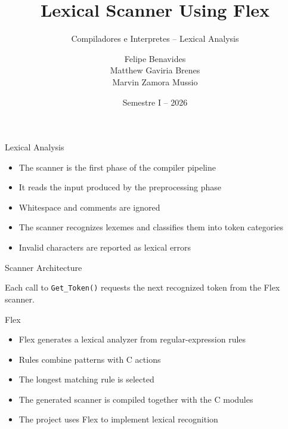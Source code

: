 \documentclass[aspectratio=169]{beamer}
\title{Lexical Scanner Using Flex}
\subtitle{Compiladores e Interpretes -- Lexical Analysis}
\author[F. Benavides, M. Gaviria, M. Zamora]{Felipe Benavides \\ Matthew Gaviria Brenes \\ Marvin Zamora Mussio}
\institute[TEC]{Ingenieria en Computación}
\date{Semestre I -- 2026}
\begin{document}
\begin{frame}
\titlepage
\end{frame}

\begin{frame}{Lexical Analysis}
\begin{itemize}
\item The scanner is the first phase of the compiler pipeline
\item It reads the input produced by the preprocessing phase
\item Whitespace and comments are ignored
\item The scanner recognizes lexemes and classifies them into token categories
\item Invalid characters are reported as lexical errors
\end{itemize}
\end{frame}

\begin{frame}{Scanner Architecture}
\begin{center}
\end{center}
\par\vspace{0.6cm}
\centering Each call to \texttt{Get\_Token()} requests the next recognized token from the Flex scanner.
\end{frame}

\begin{frame}{Flex}
\begin{itemize}
\item Flex generates a lexical analyzer from regular-expression rules
\item Rules combine patterns with C actions
\item The longest matching rule is selected
\item The generated scanner is compiled together with the C modules
\item The project uses Flex to implement lexical recognition
\end{itemize}
\end{frame}
\end{document}
